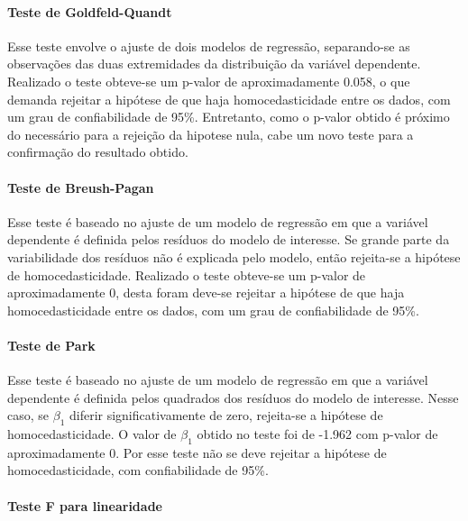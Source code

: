 \documentclass[
  letterpaper,
]{report}
\let\oldparagraph\paragraph
\renewcommand{\paragraph}[1]{\oldparagraph{#1}\mbox{}}
\begin{document}
\hypertarget{teste-de-goldfeld-quandt}{%
\paragraph{Teste de Goldfeld-Quandt}\label{teste-de-goldfeld-quandt}}

Esse teste envolve o ajuste de dois modelos de regressão, separando-se
as observações das duas extremidades da distribuição da variável
dependente. Realizado o teste obteve-se um p-valor de aproximadamente
0.058, o que demanda rejeitar a hipótese de que haja homocedasticidade
entre os dados, com um grau de confiabilidade de 95\%. Entretanto, como
o p-valor obtido é próximo do necessário para a rejeição da hipotese
nula, cabe um novo teste para a confirmação do resultado obtido.

\hypertarget{teste-de-breush-pagan}{%
\paragraph{Teste de Breush-Pagan}\label{teste-de-breush-pagan}}

Esse teste é baseado no ajuste de um modelo de regressão em que a
variável dependente é definida pelos resíduos do modelo de interesse. Se
grande parte da variabilidade dos resíduos não é explicada pelo modelo,
então rejeita-se a hipótese de homocedasticidade. Realizado o teste
obteve-se um p-valor de aproximadamente 0, desta foram deve-se rejeitar
a hipótese de que haja homocedasticidade entre os dados, com um grau de
confiabilidade de 95\%.

\hypertarget{teste-de-park}{%
\paragraph{Teste de Park}\label{teste-de-park}}

Esse teste é baseado no ajuste de um modelo de regressão em que a
variável dependente é definida pelos quadrados dos resíduos do modelo de
interesse. Nesse caso, se \(\beta_1\) diferir significativamente de
zero, rejeita-se a hipótese de homocedasticidade. O valor de \(\beta_1\)
obtido no teste foi de -1.962 com p-valor de aproximadamente 0. Por esse
teste não se deve rejeitar a hipótese de homocedasticidade, com
confiabilidade de 95\%.

\hypertarget{teste-f-para-linearidade}{%
\paragraph{Teste F para linearidade}\label{teste-f-para-linearidade}}
\end{document}
